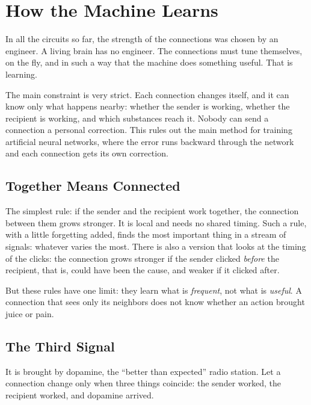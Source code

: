 \chapter{How the Machine Learns}

In all the circuits so far, the strength of the connections was chosen by an engineer. A living brain has no engineer. The connections must tune themselves, on the fly, and in such a way that the machine does something useful. That is learning.

The main constraint is very strict. Each connection changes itself, and it can know only what happens nearby: whether the sender is working, whether the recipient is working, and which substances reach it. Nobody can send a connection a personal correction. This rules out the main method for training artificial neural networks, where the error runs backward through the network and each connection gets its own correction.

\section*{Together Means Connected}

The simplest rule: if the sender and the recipient work together, the connection between them grows stronger. It is local and needs no shared timing. Such a rule, with a little forgetting added, finds the most important thing in a stream of signals: whatever varies the most. There is also a version that looks at the timing of the clicks: the connection grows stronger if the sender clicked \emph{before} the recipient, that is, could have been the cause, and weaker if it clicked after.

But these rules have one limit: they learn what is \emph{frequent}, not what is \emph{useful}. A connection that sees only its neighbors does not know whether an action brought juice or pain.

\section*{The Third Signal}

It is brought by dopamine, the ``better than expected'' radio station. Let a connection change only when three things coincide: the sender worked, the recipient worked, and dopamine arrived.


